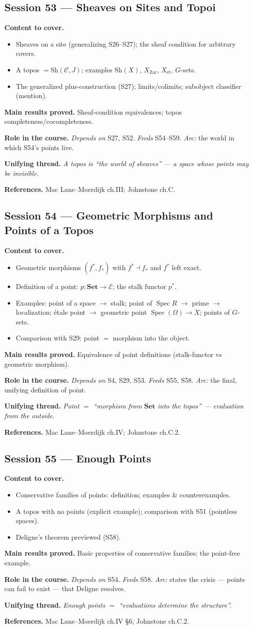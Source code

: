 \documentclass[11pt,a4paper]{article}
\newcommand{\sess}[2]{\subsection[#1. #2]{Session #1 --- #2}}
\newcommand{\chead}{\par\smallskip\noindent\textbf{Content to cover.}}
\newcommand{\proved}[1]{\par\smallskip\noindent\textbf{Main results proved.} #1}
\newcommand{\role}[1]{\par\smallskip\noindent\textbf{Role in the course.} #1}
\newcommand{\thread}[1]{\par\smallskip\noindent\textbf{Unifying thread.} \textit{#1}}
\newcommand{\srefs}[1]{\par\smallskip\noindent\textbf{References.} #1}
\newcommand{\Spec}{\operatorname{Spec}}
\begin{document}
	\sess{53}{Sheaves on Sites and Topoi}
	\chead
	\begin{itemize}
		\item Sheaves on a site (generalizing S26--S27); the sheaf condition for arbitrary covers.
		\item A topos $=\mathrm{Sh}(\mathcal C,J)$; examples $\mathrm{Sh}(X)$, $X_{\mathrm{Zar}}$, $X_{\text{\'et}}$, $G$-sets.
		\item The generalized plus-construction (S27); limits/colimits; subobject classifier (mention).
	\end{itemize}
	\proved{Sheaf-condition equivalences; topos completeness/cocompleteness.}
	\role{\emph{Depends on} S27, S52. \emph{Feeds} S54--S59. \emph{Arc:} the world in which S54's points live.}
	\thread{A topos is ``the world of sheaves'' --- a space whose points may be invisible.}
	\srefs{Mac Lane--Moerdijk ch.III; Johnstone ch.C.}
	
	\sess{54}{Geometric Morphisms and Points of a Topos}
	\chead
	\begin{itemize}
		\item Geometric morphisms $(f^*,f_*)$ with $f^*\dashv f_*$ and $f^*$ left exact.
		\item Definition of a point: $p:\mathbf{Set}\to\mathcal E$; the stalk functor $p^*$.
		\item Examples: point of a space $\to$ stalk; point of $\Spec R$ $\to$ prime $\to$ localization; \'etale point $\to$ geometric point $\Spec(\Omega)\to X$; points of $G$-sets.
		\item Comparison with S29: point $=$ morphism into the object.
	\end{itemize}
	\proved{Equivalence of point definitions (stalk-functor vs geometric morphism).}
	\role{\emph{Depends on} S4, S29, S53. \emph{Feeds} S55, S58. \emph{Arc:} the final, unifying definition of point.}
	\thread{Point $=$ ``morphism from $\mathbf{Set}$ into the topos'' --- evaluation from the outside.}
	\srefs{Mac Lane--Moerdijk ch.IV; Johnstone ch.C.2.}
	
	\sess{55}{Enough Points}
	\chead
	\begin{itemize}
		\item Conservative families of points: definition; examples \& counterexamples.
		\item A topos with no points (explicit example); comparison with S51 (pointless spaces).
		\item Deligne's theorem previewed (S58).
	\end{itemize}
	\proved{Basic properties of conservative families; the point-free example.}
	\role{\emph{Depends on} S54. \emph{Feeds} S58. \emph{Arc:} states the crisis --- points can fail to exist --- that Deligne resolves.}
	\thread{Enough points $=$ ``evaluations determine the structure''.}
	\srefs{Mac Lane--Moerdijk ch.IV \S6; Johnstone ch.C.2.}
	
\end{document}
